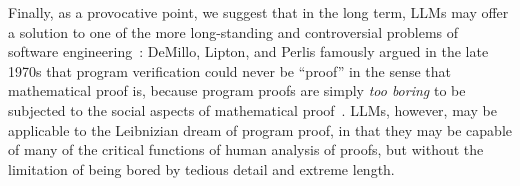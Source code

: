 \documentclass[sigconf,natbib=false]{acmart}
\begin{document}
Finally, as a provocative point, we suggest that in the long term,
LLMs may offer a solution to one of the more long-standing and
controversial problems of software engineering~\cite{mackenzie2004mechanizing}:
DeMillo, Lipton, and Perlis famously argued in the late 1970s that
program verification could never be ``proof'' in the sense that
mathematical proof is, because program proofs are simply \emph{too boring} to
be subjected to the social aspects of mathematical
proof~\cite{de1979social}.  LLMs, however, may be applicable to the Leibnizian
dream of program proof, in that they may be capable of many of the
critical functions of human analysis of proofs, but without the limitation of being
bored by tedious detail and extreme length.




\end{document}
